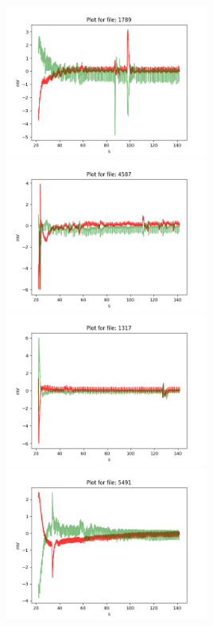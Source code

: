 \begin{figure}[ht!]
\centering
    \begin{minipage}{.5\textwidth}
      \centering
        \includegraphics[width=1.0\linewidth, height=5cm]{BachelorMasterThesis/DataExploration/Figures/sinus/ecg/1789.png}
            \label{fig:sinus_1}
        \includegraphics[width=1.0\linewidth, height=5cm]{BachelorMasterThesis/DataExploration/Figures/sinus/ecg/4587.png}
            \label{fig:sinus_2}
        \includegraphics[width=1.0\linewidth, height=5cm]{BachelorMasterThesis/DataExploration/Figures/sinus/ecg/1317.png}
            \label{fig:sinus_3}
        \includegraphics[width=1.0\linewidth, height=5cm]{BachelorMasterThesis/DataExploration/Figures/sinus/ecg/5491.png}

\end{minipage}
\end{figure}
